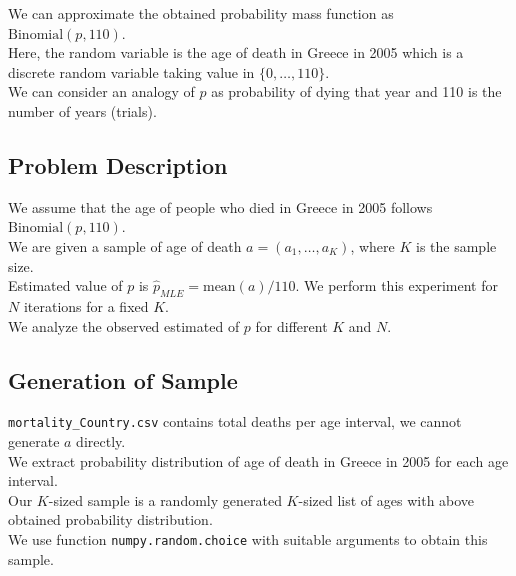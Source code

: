 \documentclass[fleqn, 11pt]{article}
\begin{document}
We can approximate the obtained probability mass function as $\mathrm{Binomial}(p, 110)$. \\
Here, the random variable is the age of death in Greece in 2005 which is a discrete random variable taking value in $\{0, \dots, 110\}$. \\
We can consider an analogy of $p$ as probability of dying that year and 110 is the number of years (trials). \\

\subsection{Problem Description}
We assume that the age of people who died in Greece in 2005 follows $\mathrm{Binomial}(p, 110)$. \\
We are given a sample of age of death $a = (a_1, \dots, a_K)$, where $K$ is the sample size. \\
Estimated value of $p$ is $\hat{p}_{MLE} = \mathrm{mean}(a) / 110$.
We perform this experiment for $N$ iterations for a fixed $K$. \\
We analyze the observed estimated of $p$ for different $K$ and $N$. \\

\subsection{Generation of Sample}
\verb!mortality_Country.csv! contains total deaths per age interval, we cannot generate $a$ directly. \\
We extract probability distribution of age of death in Greece in 2005 for each age interval. \\
Our $K$-sized sample is a randomly generated $K$-sized list of ages with above obtained probability distribution. \\
We use function \verb!numpy.random.choice! with suitable arguments to obtain this sample. \\
\end{document}

